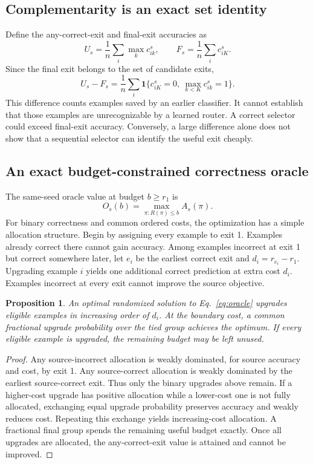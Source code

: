 \documentclass[11pt,a4paper]{article}
\newtheorem{proposition}{Proposition}
\newcommand{\ind}{\mathbf{1}}
\begin{document}
\subsection{Complementarity is an exact set identity}
Define the any-correct-exit and final-exit accuracies as
\begin{equation}
 U_s=\frac1n\sum_i\max_k c^s_{ik},\qquad F_s=\frac1n\sum_i c^s_{iK}.
\end{equation}
Since the final exit belongs to the set of candidate exits,
\begin{equation}
 U_s-F_s=\frac1n\sum_i\ind\{c^s_{iK}=0,\ \max_{k<K}c^s_{ik}=1\}.
 \label{eq:identity}
\end{equation}
This difference counts examples saved by an earlier classifier. It cannot establish that those examples are unrecognizable by a learned router. A correct selector could exceed final-exit accuracy. Conversely, a large difference alone does not show that a sequential selector can identify the useful exit cheaply.

\subsection{An exact budget-constrained correctness oracle}
The same-seed oracle value at budget $b\geq r_1$ is
\begin{equation}
 O_s(b)=\max_{\pi:R(\pi)\leq b} A_s(\pi).
 \label{eq:oracle}
\end{equation}
For binary correctness and common ordered costs, the optimization has a simple allocation structure. Begin by assigning every example to exit 1. Examples already correct there cannot gain accuracy. Among examples incorrect at exit 1 but correct somewhere later, let $e_i$ be the earliest correct exit and $d_i=r_{e_i}-r_1$. Upgrading example $i$ yields one additional correct prediction at extra cost $d_i$. Examples incorrect at every exit cannot improve the source objective.

\begin{proposition}
An optimal randomized solution to Eq.~\eqref{eq:oracle} upgrades eligible examples in increasing order of $d_i$. At the boundary cost, a common fractional upgrade probability over the tied group achieves the optimum. If every eligible example is upgraded, the remaining budget may be left unused.
\end{proposition}
\begin{proof}
Any source-incorrect allocation is weakly dominated, for source accuracy and cost, by exit 1. Any source-correct allocation is weakly dominated by the earliest source-correct exit. Thus only the binary upgrades above remain. If a higher-cost upgrade has positive allocation while a lower-cost one is not fully allocated, exchanging equal upgrade probability preserves accuracy and weakly reduces cost. Repeating this exchange yields increasing-cost allocation. A fractional final group spends the remaining useful budget exactly. Once all upgrades are allocated, the any-correct-exit value is attained and cannot be improved.
\end{proof}
\end{document}
